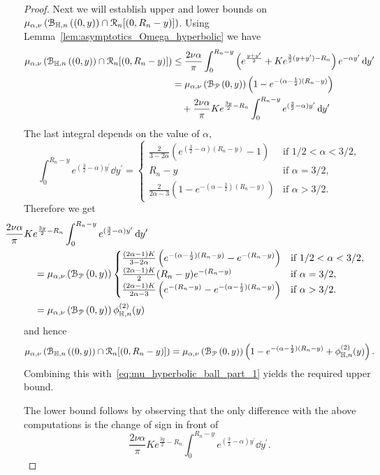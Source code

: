 \begin{proof}
Next we will establish upper and lower bounds on $\mu_{\alpha,\nu}\left({\mathcal B}_{\mathbb{H},n}\left((0,y)\right) \cap{\mathcal R}_n[(0,R_n-y)]\right)$. Using Lemma~\ref{lem:asymptotics_Omega_hyperbolic} we have 
\begin{align*}
	\mu_{\alpha,\nu}\left({\mathcal B}_{\mathbb{H},n}\left((0,y)\right) \cap{\mathcal R}_n[(0,R_n-y)]\right) 
	&\le \frac{2\nu \alpha}{\pi} \int_{0}^{R_n - y} \left(e^{\frac{y + y^\prime}{2}} + K e^{\frac{3}{2}(y + y^\prime) - R_n}\right)
		e^{-\alpha y^\prime} \operatorname{\mathrm{d}\hspace{-2pt}} y^\prime\\
	&= \mu_{\alpha,\nu}\left({\mathcal B}_{{\mathcal P}}\left(0,y\right)\right)\left(1 - e^{-(\alpha - \frac{1}{2})(R_n - y)}\right) \\
	&\hspace{10pt}+ \frac{2\nu \alpha}{\pi} K e^{\frac{3 y}{2} - R_n}\int_0^{R_n-y} e^{(\frac{3}{2} - \alpha)y^\prime} \operatorname{\mathrm{d}\hspace{-2pt}} y^\prime
\end{align*}
The last integral depends on the value of $\alpha$,
\[
	\int_0^{R_n-y} e^{(\frac{3}{2} - \alpha)y^\prime} \dd y^\prime
	= \begin{cases}
		\frac{2}{3 - 2\alpha}\left(e^{(\frac{3}{2} - \alpha)(R_n - y)} - 1\right) &\mbox{if } 1/2 < \alpha < 3/2,\\
		R_n - y &\mbox{if } \alpha = 3/2,\\
		\frac{2}{2\alpha-3}\left(1 - e^{-(\alpha - \frac{3}{2})(R_n - y)}\right) &\mbox{if } \alpha > 3/2.
	\end{cases}
\]
Therefore we get
\begin{align*}
	&\hspace{-30pt}\frac{2\nu \alpha}{\pi} K e^{\frac{3 y}{2} - R_n}
		\int_0^{R_n-y} e^{(\frac{3}{2} - \alpha)y^\prime} \dd y^\prime\\
	&= \Mu{\BallPo{0,y}}\begin{cases}
		\frac{(2\alpha - 1)K}{3 - 2\alpha}\left(e^{-(\alpha - \frac{1}{2})(R_n - y)} - e^{-(R_n - y)}\right)
		&\mbox{if } 1/2 < \alpha < 3/2,\\
		\frac{(2\alpha -1)K}{2} (R_n - y)e^{-(R_n - y)} &\mbox{if } \alpha = 3/2,\\
		\frac{(2\alpha - 1)K}{2\alpha - 3} \left(e^{-(R_n - y)} - e^{-(\alpha - \frac{1}{2})(R_n - y)}\right)
		&\mbox{if } \alpha > 3/2.
	\end{cases}\\
	&= \Mu{\BallPo{0,y}} \phi_{\H,n}^{(2)}(y)
\end{align*}
and hence
\[
	\mu_{\alpha,\nu}\left({\mathcal B}_{\mathbb{H},n}\left((0,y)\right) \cap{\mathcal R}_n[(0,R_n-y)]\right) = \mu_{\alpha,\nu}\left({\mathcal B}_{{\mathcal P}}\left(0,y\right)\right)\left(1 - e^{-(\alpha - \frac{1}{2})(R_n - y)} 
	+ \phi_{\mathbb{H},n}^{(2)}(y)\right).
\]
Combining this with~\eqref{eq:mu_hyperbolic_ball_part_1} yields the required upper bound.

The lower bound follows by observing that the only difference with the above computations is the change of sign in front of 
\[
	\frac{2 \nu \alpha}{\pi} K e^{\frac{3 y}{2} - R_n}\int_0^{R_n-y} e^{(\frac{3}{2} - \alpha)y^\prime} \dd y^\prime.
\]
\end{proof}


